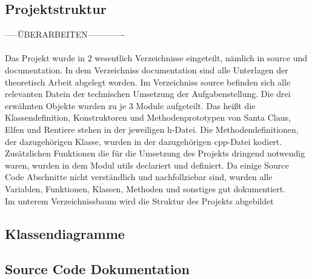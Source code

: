 \documentclass[a4paper,12pt]{article}
\begin{document}
\subsection{Projektstruktur}
-----ÜBERARBEITEN-------------\\\\
Das Projekt wurde in 2 wesentlich Verzeichnisse eingeteilt, nämlich in source und documentation. In dem Verzeichniss documentation sind alle Unterlagen der theoretisch Arbeit 
abgelegt worden. Im Verzeichniss source befinden sich alle relevanten Datein der technischen Umsetzung der Aufgabenstellung.
Die drei erwähnten Objekte wurden zu je 3 Module aufgeteilt.
Das heißt die Klassendefinition, Konstruktoren und Methodenprototypen von Santa Claus, Elfen und Rentiere stehen in der jeweiligen h-Datei. Die Methodendefinitionen, der dazugehörigen Klasse,
wurden in der dazugehörigen cpp-Datei kodiert. Zusätzlichen Funktionen die für die Umsetzung des Projekts dringend notwendig waren, wurden in dem Modul utils declariert und definiert.
Da einige Source Code Abschnitte nicht verständlich und nachfollziebar sind, wurden alle Variablen, Funktionen, Klassen, Methoden und sonstiges gut dokumentiert.\\
\newpage
Im unterem Verzeichnissbaum wird die Struktur des Projekts abgebildet
\\
\subsection{Klassendiagramme}

\subsection{Source Code Dokumentation}
\end{document}
